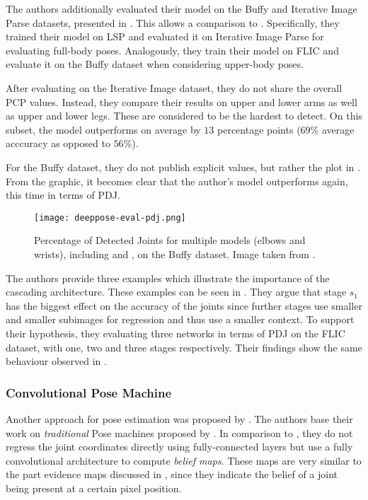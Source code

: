 The authors additionally evaluated their model on the Buffy and Iterative Image Parse datasets, presented in .
This allows a comparison to \cite{yang_articulated_2013}.
Specifically, they trained their model on LSP and evaluated it on Iterative Image Parse for evaluating full-body poses.
Analogously, they train their model on FLIC and evaluate it on the Buffy dataset when considering upper-body poses.

After evaluating on the Iterative Image dataset, they do not share the overall PCP values.
Instead, they compare their results on upper and lower arms as well as upper and lower legs.
These are considered to be the hardest to detect.
On this subset, the model outperforms \cite{yang_articulated_2013} on average by $13$ percentage points ($69\%$ average acccuracy as opposed to $56\%$).

For the Buffy dataset, they do not publish explicit values, but rather the plot in .
From the graphic, it becomes clear that the author's model outperforms \cite{yang_articulated_2013} again, this time in terms of PDJ. 

\begin{figure}[htb!]
    \centering
    \texttt{[image: deeppose-eval-pdj.png]}
    \caption{Percentage of Detected Joints for multiple models (elbows and wrists), including \cite{toshev_deeppose:_2014} and \cite{yang_articulated_2013}, on the Buffy dataset. Image taken from \cite{toshev_deeppose:_2014}.}
    \label{fig:deeppose-eval}
\end{figure}

The authors provide three examples which illustrate the importance of the cascading architecture.
These examples can be seen in .
They argue that stage $s_1$ has the biggest effect on the accuracy of the joints since further stages use smaller and smaller subimages for regression and thus use a smaller context.
To support their hypothesis, they evaluating three networks in terms of PDJ on the FLIC dataset, with one, two and three stages respectively.
Their findings show the same behaviour observed in .

\subsubsection{Convolutional Pose Machine}
\label{sec:convolutional-pose-machine}
Another approach for pose estimation was proposed by \cite{wei_convolutional_2016}.
The authors base their work on \textit{traditional} Pose machines proposed by \cite{ramakrishna_pose_2014}.
In comparison to \cite{toshev_deeppose:_2014}, they do not regress the joint coordinates directly using fully-connected layers but use a fully convolutional architecture to compute \textit{belief maps}.
These maps are very similar to the part evidence maps discussed in , since they indicate the belief of a joint being present at a certain pixel position.

